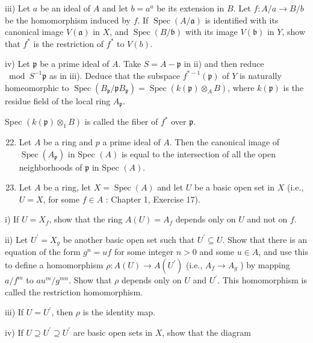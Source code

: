 \documentclass{standalone}
\theoremstyle{definition}
\theoremstyle{remark}
\begin{document}
iii) Let $a$ be an ideal of $A$ and let $b=a^{a}$ be its extension in $B$. Let $f: A / a \rightarrow B / b$ be the homomorphism induced by $f$. If $\operatorname{Spec}(A / \mathfrak{a})$ is identified with its canonical image $V(\mathfrak{a})$ in $X$, and $\operatorname{Spec}(B / \mathfrak{b})$ with its image $V(\mathfrak{b})$ in $Y$, show that $f^{*}$ is the restriction of $f^{*}$ to $V(b)$.

iv) Let $\mathfrak{p}$ be a prime ideal of $A$. Take $S=A-\mathfrak{p}$ in ii) and then reduce $\bmod S^{-1} \mathfrak{p}$ as in iii). Deduce that the subspace $f^{*-1}(\mathfrak{p})$ of $Y$ is naturally homeomorphic to $\operatorname{Spec}\left(B_{\mathfrak{p}} / \mathfrak{p} B_{\mathfrak{p}}\right)=\operatorname{Spec}\left(k(\mathfrak{p}) \otimes_{A} B\right)$, where $k(\mathfrak{p})$ is the residue field of the local ring $A_{\mathfrak{p}}$.

Spec $\left(k(\mathfrak{p}) \otimes_{1} B\right)$ is called the fiber of $f^{*}$ over $\mathfrak{p}$.

\begin{enumerate}
  \setcounter{enumi}{21}
  \item Let $A$ be a ring and $p$ a prime ideal of $A$. Then the canonical image of $\operatorname{Spec}\left(A_{\mathfrak{p}}\right)$ in Spec $(A)$ is equal to the intersection of all the open neighborhoods of $\mathfrak{p}$ in Spec $(A)$.

  \item Let $A$ be a ring, let $X=\operatorname{Spec}(A)$ and let $U$ be a basic open set in $X$ (i.e., $U=X$, for some $f \in A$ : Chapter 1, Exercise 17).

\end{enumerate}

i) If $U=X_{f}$, show that the ring $A(U)=A_{f}$ depends only on $U$ and not on $f$.

ii) Let $U^{\prime}=X_{g}$ be another basic open set such that $U^{\prime} \subseteq U$. Show that there is an equation of the form $g^{n}=u f$ for some integer $n>0$ and some $u \in A$, and use this to define a homomorphism $\rho: A(U) \rightarrow A\left(U^{\prime}\right)$ (i.e., $A_{f} \rightarrow A_{g}$ ) by mapping $a / f^{m}$ to $a u^{m} / g^{m n}$. Show that $\rho$ depends only on $U$ and $U^{\prime}$. This homomorphism is called the restriction homomorphism.

iii) If $U=U^{\prime}$, then $\rho$ is the identity map.

iv) If $U \supseteq U^{\prime} \supseteq U^{\prime}$ are basic open sets in $X$, show that the diagram
\end{document}
